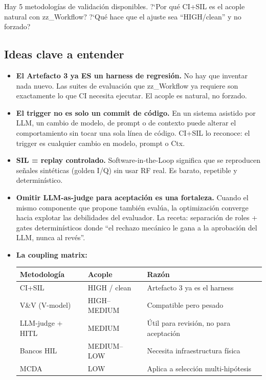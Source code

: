 \documentclass[11pt,a4paper]{article}
\begin{document}
\begin{goalbox}
Hay 5 metodolog\'ias de validaci\'on disponibles. ?`Por qu\'e CI+SIL es el acople natural con zz\_Workflow? ?`Qu\'e hace que el ajuste sea ``HIGH/clean'' y no forzado?
\end{goalbox}

\subsection{Ideas clave a entender}
\begin{itemize}
  \item \textbf{El Artefacto 3 ya ES un harness de regresi\'on.} No hay que inventar nada nuevo. Las suites de evaluaci\'on que zz\_Workflow ya requiere son exactamente lo que CI necesita ejecutar. El acople es natural, no forzado.
  \item \textbf{El trigger no es solo un commit de c\'odigo.} En un sistema asistido por LLM, un cambio de modelo, de prompt o de contexto puede alterar el comportamiento sin tocar una sola l\'inea de c\'odigo. CI+SIL lo reconoce: el trigger es cualquier cambio en modelo, prompt o Ctx.
  \item \textbf{SIL = replay controlado.} Software-in-the-Loop significa que se reproducen se\~nales sint\'eticas (golden I/Q) sin usar RF real. Es barato, repetible y determin\'istico.
  \item \textbf{Omitir LLM-as-judge para aceptaci\'on es una fortaleza.} Cuando el mismo componente que propone tambi\'en eval\'ua, la optimizaci\'on converge hacia explotar las debilidades del evaluador. La receta: separaci\'on de roles + gates determin\'isticos donde ``el rechazo mec\'anico le gana a la aprobaci\'on del LLM, nunca al rev\'es''.
  \item \textbf{La coupling matrix:}

  \begin{center}
  \begin{tabular}{@{}lll@{}}
    \toprule
    \textbf{Metodolog\'ia} & \textbf{Acople} & \textbf{Raz\'on} \\
    \midrule
    CI+SIL & HIGH / clean & Artefacto 3 ya es el harness \\
    V\&V (V-model) & HIGH--MEDIUM & Compatible pero pesado \\
    LLM-judge + HITL & MEDIUM & \'Util para revisi\'on, no para aceptaci\'on \\
    Bancos HIL & MEDIUM--LOW & Necesita infraestructura f\'isica \\
    MCDA & LOW & Aplica a selecci\'on multi-hip\'otesis \\
    \bottomrule
  \end{tabular}
  \end{center}


\end{itemize}
\end{document}
